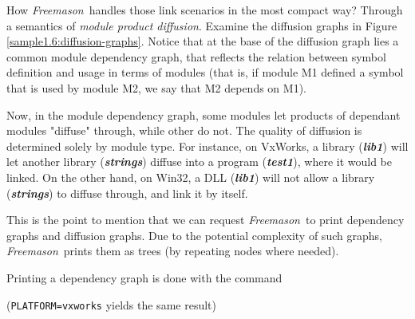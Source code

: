 \documentclass[a4paper]{article}
\newcommand{\freemason}{\textit{Freemason}}
\newcommand{\nameb}[1]{\textbf{\emph{#1}}}
\newcommand{\concept}[1]{\textit{#1}}
\begin{document}
How \freemason\ handles those link scenarios in the most compact way? Through a semantics of \concept{module product diffusion}.
Examine the diffusion graphs in Figure \ref{sample1.6:diffusion-graphs}. Notice that at
the base of the diffusion graph lies a common module dependency graph, that reflects the relation between symbol definition and
usage in terms of modules (that is, if module M1 defined a symbol that is used by module M2, we say that M2 depends on M1).
\par
Now, in the module dependency graph, some modules let products of dependant modules "diffuse" through, while other do not.
The quality of diffusion is determined solely by module type. For instance, on VxWorks, a library (\nameb{lib1}) will let
another library (\nameb{strings}) diffuse into a program (\nameb{test1}), where it would be linked.
On the other hand, on Win32, a DLL (\nameb{lib1}) will not allow a library (\nameb{strings}) to diffuse through, and link it by itself.

This is the point to mention that we can request \freemason\ to print dependency graphs and
diffusion graphs. Due to the potential complexity of such graphs, \freemason\ prints them as
trees (by repeating nodes where needed).
\par
Printing a dependency graph is done with the command
\begin{center}
\end{center}
(\verb"PLATFORM=vxworks" yields the same result)
\end{document}
